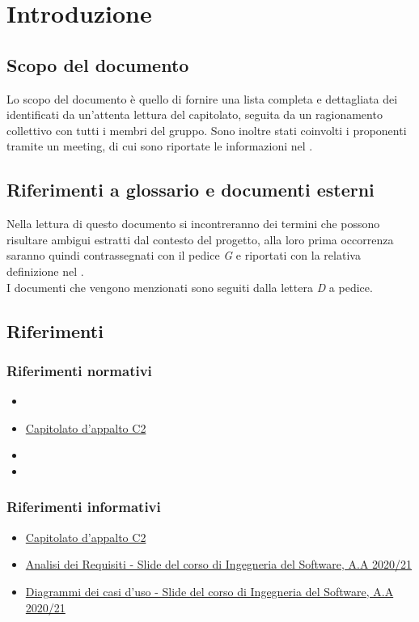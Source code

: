 \section{Introduzione} \label{_introduzione}
\subsection{Scopo del documento}
Lo scopo del documento è quello di fornire una lista completa e dettagliata dei  identificati
da un'attenta lettura del capitolato, seguita da un ragionamento collettivo con tutti i membri del gruppo.
Sono inoltre stati coinvolti i proponenti tramite un meeting, di cui sono riportate le informazioni nel .

\subsection{Riferimenti a glossario e documenti esterni}
Nella lettura di questo documento si incontreranno dei termini che possono risultare ambigui estratti dal contesto
del progetto, alla loro prima occorrenza saranno quindi contrassegnati con il pedice \textit{G} e riportati con la relativa definizione nel . \\
I documenti che vengono menzionati sono seguiti dalla lettera \textit{D} a pedice.

\subsection{Riferimenti}
\subsubsection{Riferimenti normativi}
\begin{itemize}
    \item {}
    \item \href{https://www.math.unipd.it/~tullio/IS-1/2020/Progetto/C2.pdf}{Capitolato d'appalto C2}
    \item {}
    \item {}
\end{itemize}

\subsubsection{Riferimenti informativi}
\begin{itemize}
    \item \href{https://www.math.unipd.it/~tullio/IS-1/2020/Progetto/C2.pdf}{Capitolato d'appalto C2}
    \item \href{https://www.math.unipd.it/~tullio/IS-1/2020/Dispense/L07.pdf}{Analisi dei Requisiti - Slide del corso di Ingegneria del Software, A.A 2020/21}
    \item \href{https://www.math.unipd.it/~rcardin/swea/2021/Diagrammi%20Use%20Case_4x4.pdf}{Diagrammi dei casi d'uso - Slide del corso di Ingegneria del Software, A.A 2020/21}
    
\end{itemize}
